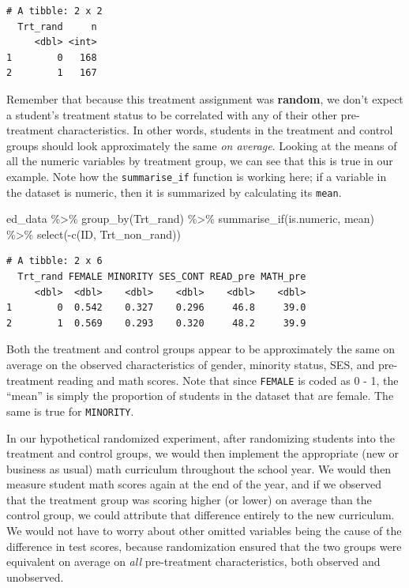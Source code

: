 \documentclass[
  letterpaper,
  DIV=11,
  numbers=noendperiod]{scrreprt}
\newenvironment{Shaded}{\begin{snugshade}}{\end{snugshade}}
\newcommand{\FunctionTok}[1]{\textcolor[rgb]{0.28,0.35,0.67}{#1}}
\newcommand{\NormalTok}[1]{\textcolor[rgb]{0.00,0.23,0.31}{#1}}
\newcommand{\SpecialCharTok}[1]{\textcolor[rgb]{0.37,0.37,0.37}{#1}}
\theoremstyle{definition}
\theoremstyle{remark}
\begin{document}
\begin{verbatim}
# A tibble: 2 x 2
  Trt_rand     n
     <dbl> <int>
1        0   168
2        1   167
\end{verbatim}

Remember that because this treatment assignment was \textbf{random}, we
don't expect a student's treatment status to be correlated with any of
their other pre-treatment characteristics. In other words, students in
the treatment and control groups should look approximately the same
\emph{on average}. Looking at the means of all the numeric variables by
treatment group, we can see that this is true in our example. Note how
the \texttt{summarise\_if} function is working here; if a variable in
the dataset is numeric, then it is summarized by calculating its
\texttt{mean}.

\begin{Shaded}
\begin{Highlighting}[]
\NormalTok{ed\_data }\SpecialCharTok{\%\textgreater{}\%} 
  \FunctionTok{group\_by}\NormalTok{(Trt\_rand) }\SpecialCharTok{\%\textgreater{}\%} 
  \FunctionTok{summarise\_if}\NormalTok{(is.numeric, mean) }\SpecialCharTok{\%\textgreater{}\%} 
  \FunctionTok{select}\NormalTok{(}\SpecialCharTok{{-}}\FunctionTok{c}\NormalTok{(ID, Trt\_non\_rand))}
\end{Highlighting}
\end{Shaded}

\begin{verbatim}
# A tibble: 2 x 6
  Trt_rand FEMALE MINORITY SES_CONT READ_pre MATH_pre
     <dbl>  <dbl>    <dbl>    <dbl>    <dbl>    <dbl>
1        0  0.542    0.327    0.296     46.8     39.0
2        1  0.569    0.293    0.320     48.2     39.9
\end{verbatim}

Both the treatment and control groups appear to be approximately the
same on average on the observed characteristics of gender, minority
status, SES, and pre-treatment reading and math scores. Note that since
\texttt{FEMALE} is coded as 0 - 1, the ``mean'' is simply the proportion
of students in the dataset that are female. The same is true for
\texttt{MINORITY}.

In our hypothetical randomized experiment, after randomizing students
into the treatment and control groups, we would then implement the
appropriate (new or business as usual) math curriculum throughout the
school year. We would then measure student math scores again at the end
of the year, and if we observed that the treatment group was scoring
higher (or lower) on average than the control group, we could attribute
that difference entirely to the new curriculum. We would not have to
worry about other omitted variables being the cause of the difference in
test scores, because randomization ensured that the two groups were
equivalent on average on \emph{all} pre-treatment characteristics, both
observed and unobserved.
\end{document}
